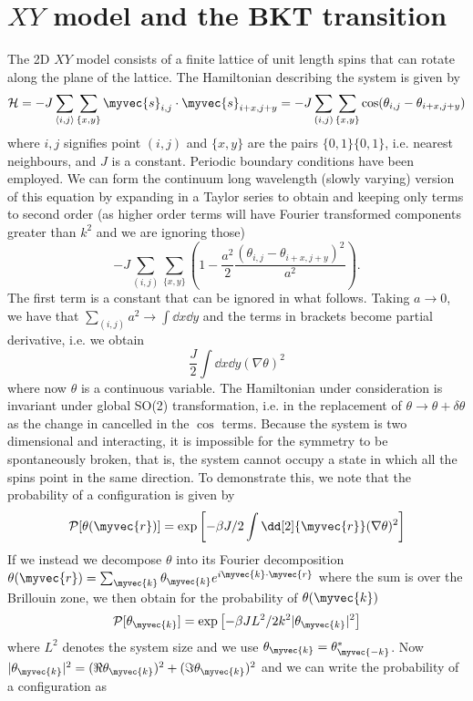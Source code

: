 \section{$XY$ model and the BKT transition}

The 2D $XY$ model consists of a finite lattice of unit length spins that can rotate along the plane of the lattice. The Hamiltonian describing the system is given by 
\[
\mathcal{H} = -J\sum_{\left <i,j \right>} \sum_{\{x,y\}} \myvec{s}_{i,j} \cdot \myvec{s}_{i+x,j+y} =
    -J\sum_{(i,j)} \sum_{\{x,y\}}  \cos( \theta_{i,j} - \theta_{i+x,j+y}) 
\]
 where $i, j$ signifies point $(i,j)$ and $\{x,y\}$ are the pairs $\{0,1\} \{0,1\}$, i.e. nearest neighbours, and $J$ is a constant. Periodic boundary conditions have been employed. We can form the continuum long wavelength (slowly varying) version of this equation by expanding in a Taylor series to obtain and keeping only terms to second order (as higher order terms will have Fourier transformed components greater than $k^2$ and we are ignoring those)
 \[
 -J\sum_{(i,j)} \sum_{\{x,y\}} \left ( 1 - \frac{a^2}{2} \frac{( \theta_{i,j} - \theta_{i+x,j+y})^2}{a^2} \right).
 \]
 The first term is a constant that can be ignored in what follows. Taking $a \to 0$, we have that $\sum_{(i,j)} a^2 \to \int \dd{x}\dd{y}$ and the terms in brackets become partial derivative, i.e. we obtain
 \[
 \frac{J}{2} \int \dd{x} \dd{y} (\nabla \theta)^2
 \]
 where now $\theta$ is a continuous variable. The Hamiltonian under consideration is invariant under global SO(2) transformation, i.e. in the replacement of $\theta \to \theta + \delta \theta$ as the change in cancelled in the $\cos$ terms. Because the system is two dimensional and interacting, it is impossible for the symmetry to be spontaneously broken, that is, the system cannot occupy a state in which all the spins point in the same direction. To demonstrate this, we note that the probability of a configuration is given by 
 \[
  \mathcal{P}[\theta(\myvec{r})] =   \exp \left [   -\beta J/2 \int \dd[2]{\myvec{r}} (\nabla \theta)^2 \right ]
 \] 
 If we instead we decompose  $\theta$ into its Fourier decomposition $\theta(\myvec{r}) = \sum_{\myvec{k}} \theta_{\myvec{k}} e^{i \myvec{k}\cdot \myvec{r}}$ where the sum is over the Brillouin zone, we then obtain for the probability of $\theta(\myvec{k})$
 \[
 \mathcal{P}[\theta_{\myvec{k}}] = \exp \left[-\beta J L^2/2 k^2 |\theta_{\myvec{k}}|^2 \right]
 \]
 where $L^2$ denotes the system size and we use $\theta_{\myvec{k}} = \theta_{\myvec{-k}}^*$. Now $|\theta_{\myvec{k}}|^2 = (\Re \theta_{\myvec{k}})^2 + (\Im \theta_{\myvec{k}})^2$ and we can write the probability of a configuration as 
